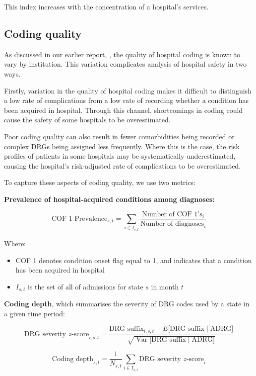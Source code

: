 \documentclass[submission]{grattan}
\begin{document}
This index increases with the concentration of a hospital's services.

\subsection{Coding quality}\label{subsec:coding-quality}

As discussed in our earlier report, , the quality of hospital coding is known to vary by institution.
This variation complicates analysis of hospital safety in two ways.

Firstly, variation in the quality of hospital coding makes it difficult to distinguish a low rate of complications from a low rate of recording whether a condition has been acquired in hospital.
Through this channel, shortcomings in coding could cause the safety of some hospitals to be overestimated.

Poor coding quality can also result in fewer comorbidities being recorded or complex DRGs being assigned less frequently.
Where this is the case, the risk profiles of patients in some hospitals may be systematically underestimated, causing the hospital's risk-adjusted rate of complications to be overestimated.

To capture these aspects of coding quality, we use two metrics:

\textbf{Prevalence of hospital-acquired conditions among diagnoses:}

\[\text{COF\ 1\ Prevalence}_{s,t} = \sum_{i \in I_{s,t}}\frac{\text{Number of COF 1's}_{i}}{\text{Number\ of\ diagnoses}_{i}}\]

Where:
\begin{itemize}
\item[]
  COF 1 denotes condition onset flag equal to 1, and indicates that a condition has been acquired in hospital
\item[] \(I_{s,t}\) is the set of all of admissions for state \(s\) in month \(t\)
\end{itemize}


\textbf{Coding depth}, which summarises the severity of DRG codes used by a state in a given time period:


\[\text{DRG severity \(z\)-score}_{i,s,t} = \frac{\text{DRG suffix}_{i,s,t} - E\bigl[\text{DRG suffix}\mid\text{ADRG}\bigr]}{\sqrt{\operatorname{Var}\bigl[\text{DRG suffix}\mid\text{ADRG}\bigr]}}\]

\[\text{Coding\ depth}_{s,t} = \frac{1}{N_{s,t}}\sum_{i \in I_{s,t}}\text{DRG severity \(z\)-score}_{i}\]
\end{document}
